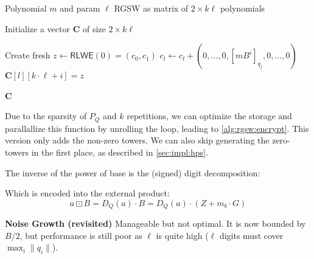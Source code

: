     \begin{algorithm}
    \caption{Encrypt RGSW}
    \label{alg:rgsw:encrypt0}
    \begin{algorithmic}[1]
    \Require Polynomial $m$ and param $\ell$
    \Ensure RGSW as matrix of $2\times k \ell$ polynomials
    
    \State Initialize a vector $\mathbf{C}$ of size $2 \times k \ell$
    
        \For{$j \in [0, k)$}
            \For{$i \in [0, \ell)$}
                \State Create fresh $z \leftarrow \mathsf{RLWE}(0) = (c_0, c_1)$
                \State $c_l \leftarrow c_l + (0, \dots, 0, [mB^i]_{q_j}, 0, \dots, 0)$
                \State $\mathbf{C}[l][k\cdot \ell + i] = z$
            \EndFor
        \EndFor
    \EndFor
    
    \State \Return $\mathbf{C}$
    \end{algorithmic}
    \end{algorithm}
    
    \begin{remark}
        Due to the sparsity of $P_Q$ and $k$ repetitions, we can optimize the storage and parallallize this function by unrolling the loop, leading to \autoref{alg:rgsw:encrypt}. %
        This version only adds the non-zero towers. We can also skip generating the zero-towers in the first place, as described in \autoref{sec:impl:hps}.
    \end{remark}
    
    The inverse of the power of base is the (signed) digit decomposition:
    
    
    
    Which is encoded into the external product:
    \begin{equation*}
        a\boxdot B = D_Q(a) \cdot B = D_Q(a)\cdot (Z + m_b\cdot G)
    \end{equation*}
    
    \noindent\textbf{Noise Growth (revisited)}
    Manageable but not optimal. It is now bounded by $B/2$, but performance is still poor as $\ell$ is quite high ($\ell$ digits must cover $\max_i{\|q_i\|}$).

\newpage
\newpage
\fi